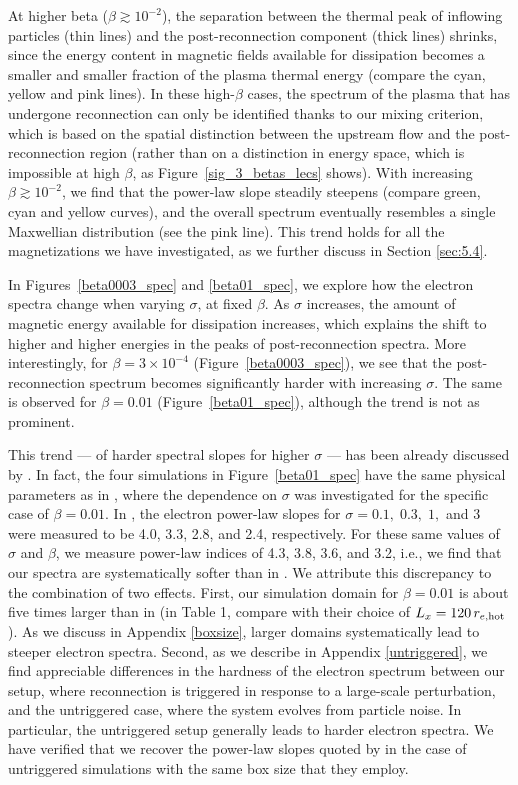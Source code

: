 At higher beta ($\beta\gtrsim 10^{-2}$), the separation between the thermal peak of inflowing particles (thin lines) and the post-reconnection component (thick lines) shrinks, since the energy content in magnetic fields available for dissipation becomes a smaller and smaller fraction of the plasma thermal energy (compare the cyan, yellow and pink lines). In these high-$\beta$ cases, the spectrum of the plasma that has undergone reconnection can only be identified thanks to our mixing criterion, which is based on the spatial distinction between the upstream flow and the post-reconnection region (rather than on a distinction in energy space, which is impossible at high $\beta$, as Figure~\ref{sig_3_betas_lecs} shows). With increasing $\beta\gtrsim 10^{-2}$, we find that the power-law slope steadily steepens (compare green, cyan and yellow curves), and the overall spectrum  eventually resembles a single Maxwellian distribution (see the pink line). This trend holds for all the magnetizations we have investigated, as we further discuss in Section \ref{sec:5.4}.

In Figures~\ref{beta0003_spec} and \ref{beta01_spec}, we explore how the electron spectra change when varying $\sigma$, at fixed $\beta$. As $\sigma$ increases, the amount of magnetic energy available for dissipation increases, which explains the shift to higher and higher energies in the peaks of post-reconnection spectra. 
More interestingly, for $\beta=3\times10^{-4}$ (Figure~\ref{beta0003_spec}), we see that the post-reconnection spectrum becomes significantly harder with increasing $\sigma$.  The same is observed for $\beta=0.01$ (Figure~\ref{beta01_spec}), although the trend is not as prominent.

This trend --- of harder spectral slopes for higher $\sigma$ --- has been already discussed by \citet{werner2018}. In fact, the four simulations  in Figure~\ref{beta01_spec} have the same physical parameters as in \citet{werner2018}, where the dependence on $\sigma$ was investigated for the specific case of $\beta=0.01$.
In \citet{werner2018}, the electron power-law slopes for $\sigma=0.1, \; 0.3, \; 1,$ and $ 3$ were measured to be 4.0, 3.3, 2.8, and 2.4, respectively.  For these same values of $\sigma$ and $\beta$, we measure power-law indices of 4.3, 3.8, 3.6, and 3.2, i.e., we find that our spectra are systematically softer than in \citet{werner2018}. We attribute this discrepancy to the combination of two effects. First, our simulation domain for $\beta=0.01$ is about five times larger than in \citet{werner2018} (in Table 1, compare with their choice of $L_x=120\,r_{e,\rm hot}$). As we  discuss in Appendix \ref{boxsize}, larger domains systematically lead to steeper electron spectra. Second, as we describe in Appendix \ref{untriggered}, we find appreciable differences in the hardness of the electron spectrum between our setup, where reconnection is triggered in response to a large-scale perturbation, and the untriggered case, where the system evolves from particle noise. In particular, the untriggered setup generally leads to harder electron spectra. We have verified that we  recover the power-law slopes quoted by  \citet{werner2018} in the case of untriggered simulations with the same box size that they employ.


